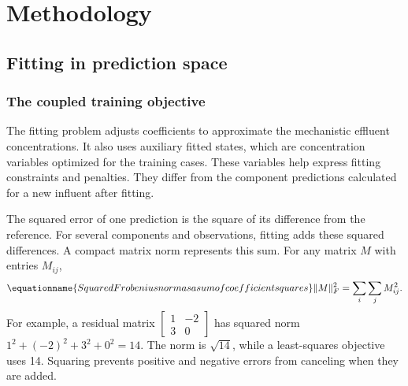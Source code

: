 \section{Methodology}

\subsection{Fitting in prediction space}

\subsubsection{The coupled training objective}

The fitting problem adjusts coefficients to approximate the mechanistic effluent concentrations. It also uses auxiliary fitted states, which are concentration variables optimized for the training cases. These variables help express fitting constraints and penalties. They differ from the component predictions calculated for a new influent after fitting.

The squared error of one prediction is the square of its difference from the reference. For several components and observations, fitting adds these squared differences. A compact matrix norm represents this sum. For any matrix \(M\) with entries \(M_{ij}\),
\begin{equation}
\equationname{Squared Frobenius norm as a sum of coefficient squares}
\label{eq:icsor_frobenius_definition}
\|M\|_F^2=\sum_i\sum_j M_{ij}^2.
\end{equation}
For example, a residual matrix \(\begin{bmatrix}1&-2\\3&0\end{bmatrix}\) has squared norm \(1^2+(-2)^2+3^2+0^2=14\). The norm is \(\sqrt{14}\), while a least-squares objective uses 14. Squaring prevents positive and negative errors from canceling when they are added.

